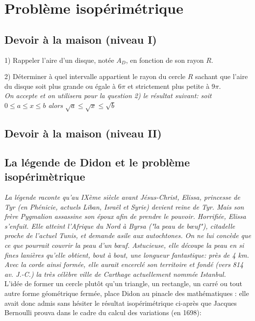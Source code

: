 \documentclass[frenchb]{article}
\begin{document}
\section{Problème isopérimétrique}
\subsection*{Devoir à la maison (niveau I)}
1) Rappeler l'aire d'un disque, notée $A_D$, en fonction de son rayon $R$.

2) Déterminer à quel intervalle appartient le rayon du cercle $R$ sachant que l'aire du disque soit plus grande ou égale à  $6\pi$ et strictement plus petite à $9\pi$.\\


\textit{On accepte et on utilisera pour la question 2) le résultat suivant: soit $0 \leq a \leq x \leq b$ alors $\sqrt{a} \leq \sqrt{x} \leq \sqrt{b}$ }

\subsection*{Devoir à la maison (niveau II)}

\subsection*{La légende de Didon et le problème isopérimètrique}

\textit{La légende raconte qu'au IXème siècle avant Jésus-Christ, Elissa, princesse de Tyr (en Phénicie, actuels Liban, Israël et Syrie) devient reine de Tyr. Mais son frère Pygmalion assassine son époux afin de prendre le pouvoir. Horrifiée, Elissa s'enfuit. Elle atteint l'Afrique du Nord à Byrsa ("la peau de bœuf"), citadelle proche de l'actuel Tunis, et demande asile aux autochtones. On ne lui concède que ce que pourrait couvrir la peau d'un bœuf. Astucieuse, elle découpe la peau en si fines lanières qu'elle obtient, bout à bout, une longueur fantastique: près de 4 km. Avec la corde ainsi formée, elle aurait encerclé son territoire et fondé (vers 814 av. J.-C.) la très célèbre ville de Carthage actuellement nommée Istanbul.}\\



L'idée de former un cercle plutôt qu'un triangle, un rectangle, un carré ou tout autre forme géométrique fermée, place Didon au pinacle des mathématiques : elle avait donc admis sans hésiter le résultat isopérimétrique ci-après que Jacques Bernoulli prouva dans le cadre du calcul des variations (en 1698):
\end{document}
